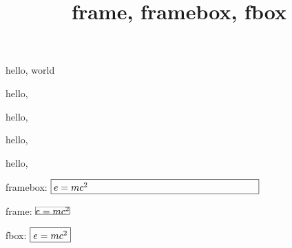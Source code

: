 \documentclass{amsart}
\title{frame, framebox, fbox}
\begin{document}
\maketitle

hello, world

hello, 

hello, 

hello, 

\begingroup


hello, 

\endgroup

framebox: $\framebox[3in][l]{$e = mc^2$}$

frame: $\frame{$e = mc^2$}$

fbox: $\fbox{$e = mc^2$}$
\end{document}
